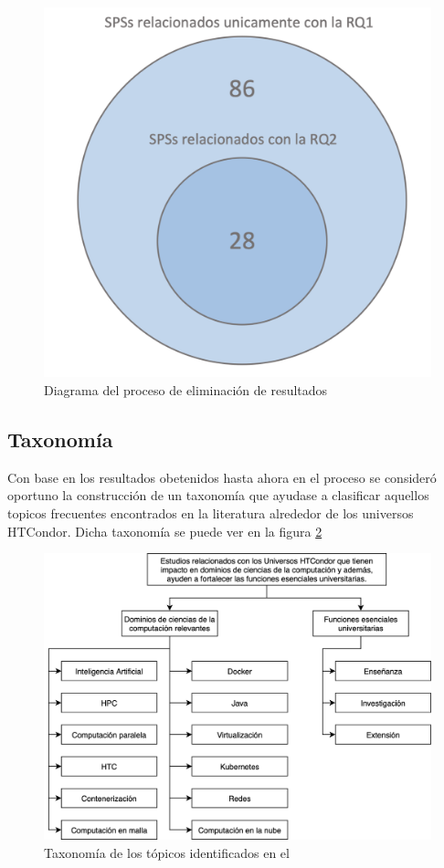 \begin{figure}[H]
	\centering
	\includegraphics[scale=0.3] {tablas-images/sms/plot-venn-RQs.png}
	\caption{Diagrama del proceso de eliminación de resultados}\label{fig:plot-venn-RQs}
\end{figure}


\subsection{Taxonomía}

Con base en los resultados obetenidos hasta ahora en el proceso \SMS se consideró oportuno la construcción de un taxonomía que ayudase a clasificar aquellos topicos frecuentes encontrados en la literatura alrededor de los universos HTCondor. Dicha taxonomía se puede ver en la figura \ref{fig:taxonomia}

\begin{figure}[H]
	\centering
	\includegraphics[scale=0.15] {tablas-images/sms/taxonomia.png}
	\caption{Taxonomía de los tópicos identificados en el \SMS}\label{fig:taxonomia}
\end{figure}





